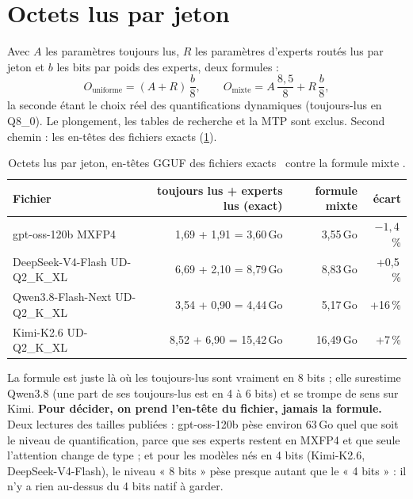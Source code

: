 \section{Octets lus par jeton}\label{sec:octets-jeton}

Avec $A$ les paramètres toujours lus, $R$ les paramètres d'experts routés lus par jeton et $b$ les bits par poids des experts, deux formules :
\begin{equation}\label{eq:octets-jeton}
O_{\text{uniforme}} = (A + R)\,\frac{b}{8}, \qquad O_{\text{mixte}} = A\,\frac{8{,}5}{8} + R\,\frac{b}{8},
\end{equation}
la seconde étant le choix réel des quantifications dynamiques (toujours-lus en Q8\_0). Le plongement, les tables de recherche et la MTP sont exclus. Second chemin : les en-têtes des fichiers exacts (\cref{tab:octets-fichiers}).

\begin{table}[ht]
\centering\small
\caption[Octets lus par jeton : en-têtes contre formule]{Octets lus par jeton, en-têtes GGUF des fichiers exacts \mes~contre la formule mixte \calc.}
\label{tab:octets-fichiers}
\begin{tabular}{@{}lrrr@{}}
\toprule
Fichier & toujours lus + experts lus (exact) & formule mixte & écart \\
\midrule
gpt-oss-120b MXFP4 & 1,69 + 1,91 = 3,60\,Go & 3,55\,Go & $-1{,}4$\,\% \\
DeepSeek-V4-Flash UD-Q2\_K\_XL & 6,69 + 2,10 = 8,79\,Go & 8,83\,Go & +0,5\,\% \\
Qwen3.8-Flash-Next UD-Q2\_K\_XL & 3,54 + 0,90 = 4,44\,Go & 5,17\,Go & +16\,\% \\
Kimi-K2.6 UD-Q2\_K\_XL & 8,52 + 6,90 = 15,42\,Go & 16,49\,Go & +7\,\% \\
\bottomrule
\end{tabular}
\end{table}

La formule est juste là où les toujours-lus sont vraiment en 8 bits ; elle surestime Qwen3.8 (une part de ses toujours-lus est en 4 à 6 bits) et se trompe de sens sur Kimi. \textbf{Pour décider, on prend l'en-tête du fichier, jamais la formule.} Deux lectures des tailles publiées : gpt-oss-120b pèse environ 63\,Go quel que soit le niveau de quantification, parce que ses experts restent en MXFP4 et que seule l'attention change de type ; et pour les modèles nés en 4 bits (Kimi-K2.6, DeepSeek-V4-Flash), le niveau « 8 bits » pèse presque autant que le « 4 bits » : il n'y a rien au-dessus du 4 bits natif à garder.

